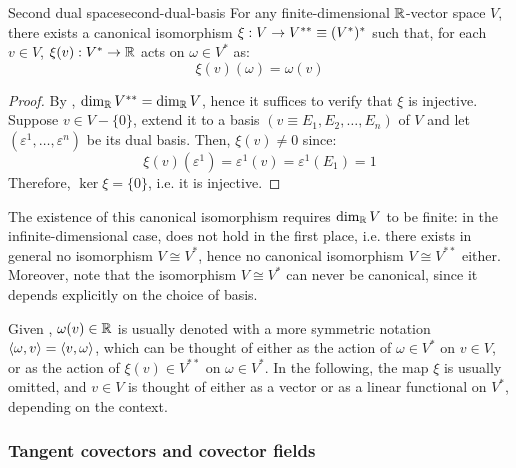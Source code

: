 \begin{proposition}{Second dual space}{second-dual-basis}
  For any finite-dimensional $ \mathbb{R} $-vector space $ V $, there exists a canonical isomorphism $ \xi : V \rightarrow V^{**} \equiv (V^*)^* $ such that, for each $ v \in V $, $ \xi(v) : V^* \rightarrow \mathbb{R} $ acts on $ \omega \in V^* $ as:
  \begin{equation}
    \xi(v)(\omega) = \omega(v)
  \end{equation}
\end{proposition}

\begin{proofbox}
  \begin{proof}
    By , $ \dim_{\mathbb{R}} V^{**} = \dim_{\mathbb{R}} V $, hence it suffices to verify that $ \xi $ is injective. Suppose $ v \in V - \{0\} $, extend it to a basis $ (v \equiv E_1 , E_2 , \dots , E_n) $ of $ V $ and let $ (\varepsilon^1 , \dots , \varepsilon^n) $ be its dual basis. Then, $ \xi(v) \neq 0 $ since:
    \begin{equation*}
      \xi(v)(\varepsilon^1) = \varepsilon^1(v) = \varepsilon^1(E_1) = 1
    \end{equation*}
    Therefore, $ \ker \xi = \{0\} $, i.e. it is injective.
  \end{proof}
\end{proofbox}

The existence of this canonical isomorphism requires $ \dim_{\mathbb{R}} V $ to be finite: in the infinite-dimensional case,  does not hold in the first place, i.e. there exists in general no isomorphism $ V \cong V^* $, hence no canonical isomorphism $ V \cong V^{**} $ either. Moreover, note that the isomorphism $ V \cong V^* $ can never be canonical, since it depends explicitly on the choice of basis.

Given , $ \omega(v) \in \mathbb{R} $ is usually denoted with a more symmetric notation $ \braket{\omega , v} = \braket{v , \omega} $, which can be thought of either as the action of $ \omega \in V^* $ on $ v \in V $, or as the action of $ \xi(v) \in V^{**} $ on $ \omega \in V^* $. In the following, the map $ \xi $ is usually omitted, and $ v \in V $ is thought of either as a vector or as a linear functional on $ V^* $, depending on the context.

\subsubsection{Tangent covectors and covector fields}

